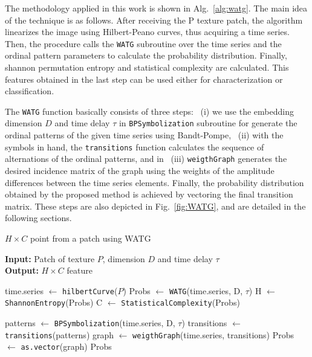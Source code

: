 \documentclass[journal]{IEEEtran}
\begin{document}
	The methodology applied in this work is shown in Alg.~\ref{alg:watg}.
	The main idea of the technique is as follows.
	After receiving the P texture patch, the algorithm linearizes the image using Hilbert-Peano curves, thus acquiring a time series.
	Then, the procedure calls the \texttt{WATG} subroutine over the time series and the ordinal pattern parameters to calculate the probability distribution.
	Finally, shannon permutation entropy and statistical complexity are calculated.
	This features obtained in the last step can be used either for characterization or classification.
	
	The \texttt{WATG} function basically consists of three steps: ~(i) we use the embedding dimension $D$ and time delay $\tau$ in \texttt{BPSymbolization} subroutine for generate the ordinal patterns of the given time series using Bandt-Pompe, ~(ii) with the symbols in hand, the \texttt{transitions} function calculates the sequence of alternations of the ordinal patterns, and in ~(iii) \texttt{weigthGraph} generates the desired incidence matrix of the graph using the weights of the amplitude differences between the time series elements.
	Finally, the probability distribution obtained by the proposed method is achieved by vectoring the final transition matrix.
	These steps are also depicted in Fig.~\ref{fig:WATG}, and are detailed in the following sections.
	
	\begin{algorithm}[h]
		\caption{$H \times C$ point from a patch using WATG}
		\label{alg:watg}                                
		\textbf{Input:} Patch of texture $P$, dimension $D$ and time delay \textbf{$\tau$}\\
		\textbf{Output:} $H \times C$ feature
		\begin{algorithmic}[1]
			\State time.series $\gets$ \texttt{hilbertCurve}($P$)
			\State Probs $\gets$ \texttt{WATG}(time.series, D, $\tau$)
			\State H $\gets$ \texttt{ShannonEntropy}(Probs)
			\State C $\gets$ \texttt{StatisticalComplexity}(Probs)
			
			\vspace{0.15cm}
			
			\State patterns $\gets$ \texttt{BPSymbolization}(time.series, D, $\tau$)
			\State transitions $\gets$ \texttt{transitions}(patterns)
			\State graph $\gets$ \texttt{weigthGraph}(time.series, transitions)
			\State Probs $\gets$ \texttt{as.vector}(graph)
			\State \Return Probs
			\EndFunction
		\end{algorithmic}
	\end{algorithm}
	
\end{document}
